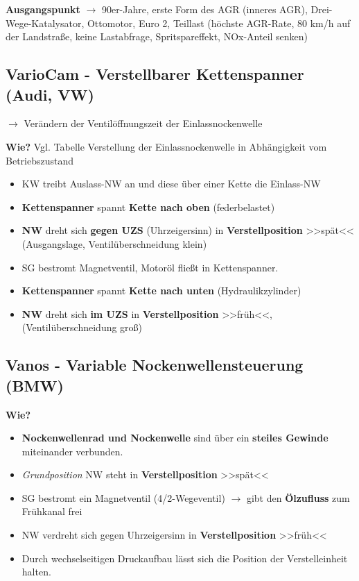 \textbf{Ausgangspunkt} $\to$ 90er-Jahre, erste Form des AGR (inneres
AGR), Drei-Wege-Katalysator, Ottomotor, Euro 2, Teillast (höchste
AGR-Rate, 80 km/h auf der Landstraße, keine Lastabfrage,
Spritspareffekt, NOx-Anteil senken)

\subsection{VarioCam - Verstellbarer Kettenspanner (Audi,
VW)}\label{variocam-verstellbarer-kettenspanner-audi-vw}

$\to$ Verändern der Ventilöffnungszeit der Einlassnockenwelle

\textbf{Wie?} Vgl. Tabelle Verstellung der Einlassnockenwelle in
Abhängigkeit vom Betriebszustand

\begin{itemize}
\item
  KW treibt Auslass-NW an und diese über einer Kette die Einlass-NW
\item
  \textbf{Kettenspanner} spannt \textbf{Kette nach oben} (federbelastet)
\item
  \textbf{NW} dreht sich \textbf{gegen UZS} (Uhrzeigersinn) in
  \textbf{Verstellposition} >>spät<< (Ausgangslage, Ventilüberschneidung
  klein)
\item
  SG bestromt Magnetventil, Motoröl fließt in Kettenspanner.
\item
  \textbf{Kettenspanner} spannt \textbf{Kette nach unten}
  (Hydraulikzylinder)
\item
  \textbf{NW} dreht sich \textbf{im UZS} in \textbf{Verstellposition}
  >>früh<<, (Ventilüberschneidung groß)
\end{itemize}

\subsection{Vanos - Variable Nockenwellensteuerung
(BMW)}\label{vanos-variable-nockenwellensteuerung-bmw}

\textbf{Wie?}

\begin{itemize}
\item
  \textbf{Nockenwellenrad und Nockenwelle} sind über ein \textbf{steiles
  Gewinde} miteinander verbunden.
\item
  \emph{Grundposition} NW steht in \textbf{Verstellposition} >>spät<<
\item
  SG bestromt ein Magnetventil (4/2-Wegeventil) $\to$ gibt den
  \textbf{Ölzufluss} zum Frühkanal frei
\item
  NW verdreht sich gegen Uhrzeigersinn in \textbf{Verstellposition}
  >>früh<<
\item
  Durch wechselseitigen Druckaufbau lässt sich die Position der
  Verstelleinheit halten.
\end{itemize}

